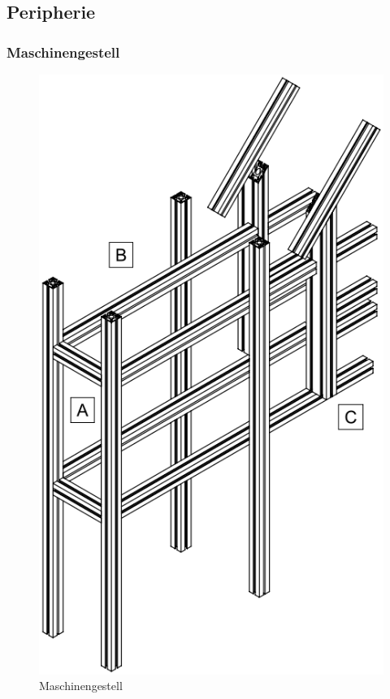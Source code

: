 \subsection{Peripherie}

\subsubsection{Maschinengestell}
\begin{figure}
	\includegraphics[scale=0.41]{Illustrationen/6-Umsetzung/maschinengestell.PNG}
	\caption{Maschinengestell}
	\label{fig:maschinengestell}
\end{figure}

